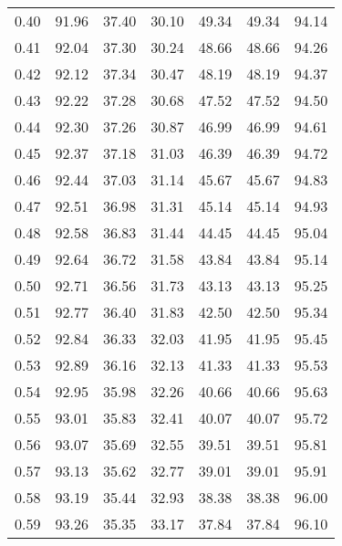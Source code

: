 \begin{tabular}{|c|c|c|c|c|c|c|}
      0.40 &     91.96 &     37.40 &      30.10 &   49.34 &      49.34 &         94.14 \\
      0.41 &     92.04 &     37.30 &      30.24 &   48.66 &      48.66 &         94.26 \\
      0.42 &     92.12 &     37.34 &      30.47 &   48.19 &      48.19 &         94.37 \\
      0.43 &     92.22 &     37.28 &      30.68 &   47.52 &      47.52 &         94.50 \\
      0.44 &     92.30 &     37.26 &      30.87 &   46.99 &      46.99 &         94.61 \\
      0.45 &     92.37 &     37.18 &      31.03 &   46.39 &      46.39 &         94.72 \\
      0.46 &     92.44 &     37.03 &      31.14 &   45.67 &      45.67 &         94.83 \\
      0.47 &     92.51 &     36.98 &      31.31 &   45.14 &      45.14 &         94.93 \\
      0.48 &     92.58 &     36.83 &      31.44 &   44.45 &      44.45 &         95.04 \\
      0.49 &     92.64 &     36.72 &      31.58 &   43.84 &      43.84 &         95.14 \\
      0.50 &     92.71 &     36.56 &      31.73 &   43.13 &      43.13 &         95.25 \\
      0.51 &     92.77 &     36.40 &      31.83 &   42.50 &      42.50 &         95.34 \\
      0.52 &     92.84 &     36.33 &      32.03 &   41.95 &      41.95 &         95.45 \\
      0.53 &     92.89 &     36.16 &      32.13 &   41.33 &      41.33 &         95.53 \\
      0.54 &     92.95 &     35.98 &      32.26 &   40.66 &      40.66 &         95.63 \\
      0.55 &     93.01 &     35.83 &      32.41 &   40.07 &      40.07 &         95.72 \\
      0.56 &     93.07 &     35.69 &      32.55 &   39.51 &      39.51 &         95.81 \\
      0.57 &     93.13 &     35.62 &      32.77 &   39.01 &      39.01 &         95.91 \\
      0.58 &     93.19 &     35.44 &      32.93 &   38.38 &      38.38 &         96.00 \\
      0.59 &     93.26 &     35.35 &      33.17 &   37.84 &      37.84 &         96.10 \\

\end{tabular}
